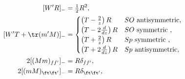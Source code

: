 \begin{equation}
\begin{split}
 [W'R]_-&= \tfrac{1}{2} R^2, \\
 [W'T+\tr(m'M)]_-&=
 \begin{cases}
  \left(T-\frac{2}{z}\right)R    & \text{$SO$ antisymmetric}, \\
  \left(T-2\frac{d}{dz}\right)R  & \text{$SO$ symmetric    }, \\
  \left(T+\frac{2}{z}\right)R    & \text{$Sp$ symmetric    }, \\
  \left(T+2\frac{d}{dz}\right)R  & \text{$Sp$ antisymmetric},
 \end{cases}
 \\
 2[(Mm)_{ff'}]_-     &=  R\delta_{ff'    }, \\
 2[(mM)_{\ft\ft'}]_- &=  R\delta_{\ft\ft'},
\end{split}
\label{eq:loop_eq_gt}
\end{equation}

